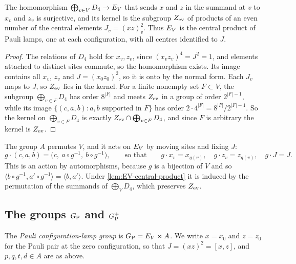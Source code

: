 \begin{lemma}\label{lem:EV-central-product}
The homomorphism $\bigoplus_{v\in V}D_4\to E_V$ that sends $x$ and $z$ in the summand at $v$ to $x_v$ and $z_v$ is surjective, and its
kernel is the subgroup $Z_{\rm ev}$ of products of an even number of the central elements $J_v=(xz)^2_v$. Thus $E_V$ is the central product
of Pauli lamps, one at each configuration, with all centres identified to $J$.
\end{lemma}

\begin{proof}
The relations of $D_4$ hold for $x_v,z_v$, since $(x_vz_v)^4=J^2=1$, and elements attached to distinct sites commute, so the homomorphism
exists. Its image contains all $x_v$, $z_v$ and $J=(x_0z_0)^2$, so it is onto by the normal form. Each $J_v$ maps to $J$, so $Z_{\rm ev}$
lies in the kernel. For a finite nonempty set $F\subset V$, the subgroup $\bigoplus_{v\in F}D_4$ has order $8^{|F|}$ and meets $Z_{\rm ev}$
in a group of order $2^{|F|-1}$, while its image $\{(c,a,b):a,b\text{ supported in }F\}$ has order $2\cdot4^{|F|}=8^{|F|}/2^{|F|-1}$. So the
kernel on $\bigoplus_{v\in F}D_4$ is exactly $Z_{\rm ev}\cap\bigoplus_{v\in F}D_4$, and since $F$ is arbitrary the kernel is $Z_{\rm ev}$.
\end{proof}

The group $A$ permutes $V$, and it acts on $E_V$ by moving sites and fixing $J$:
\[
g\cdot(c,a,b)=\bigl(c,\ a\circ g^{-1},\ b\circ g^{-1}\bigr),\qquad\text{so that}\qquad g\cdot x_v=x_{g(v)},\quad g\cdot z_v=z_{g(v)},\quad
g\cdot J=J .
\]
This is an action by automorphisms, because $g$ is a bijection of $V$ and so $\langle b\circ g^{-1},a'\circ g^{-1}\rangle=\langle
b,a'\rangle$. Under \cref{lem:EV-central-product} it is induced by the permutation of the summands of $\bigoplus_VD_4$, which preserves
$Z_{\rm ev}$.

\subsection{The groups \texorpdfstring{$G_{\mathrm P}$}{G\_P} and \texorpdfstring{$G_{\mathrm P}^{+}$}{G\_P+}}\label{sec:group-GP}

\begin{definition}\label{def:GP}
The \emph{Pauli configuration-lamp group} is $G_{\mathrm P}=E_V\rtimes A$. We write $x=x_0$ and $z=z_0$ for the Pauli pair at the zero
configuration, so that $J=(xz)^2=[x,z]$, and $p,q,t,d\in A$ are as above.
\end{definition}

